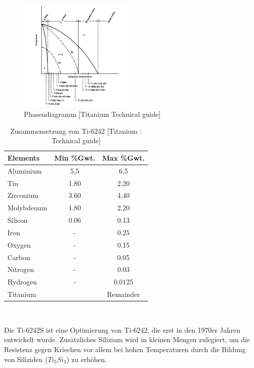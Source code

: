 \begin{figure}[H]
	\centering
	\includegraphics[width=0.5\textwidth]{Bilder/Phasendiagram}
	\caption{Phasendiagramm [Titanium Technical guide]}
	\label{tab:PD-Ti6242}
\end{figure}





\begin{table}[H]
	
	\centering	
	\begin{tabular}{|l |c |c|}
		\hline
		\centering
		\hspace{20ex}Elements \hspace{20ex} & Min \%Gwt. & Max \%Gwt.\\
		\hline
		Aluminium&5,5&6,5\\
		Tin&1.80&2.20\\
		Zirconium&3.60&4.40\\
		Molybdenum&1.80&2.20\\
		Silicon &0.06&0.13\\
		Iron&-&0.25\\
		Oxygen&-&0.15\\
		Carbon&	-&	0.05\\
		Nitrogen&-&0.03\\
		Hydrogen&-&0.0125\\
		
		Titanium &&Remainder\\
		\hline
	\end{tabular}
	\caption{Zusammensetzung von Ti-6242 [Titanium : Technical guide]}
	\label{tab:Zusammensetzung}
\end{table}
\

Die Ti-6242S ist eine Optimierung von Ti-6242, die erst in den 1970er Jahren  entwickelt wurde. Zusätzliches Silizium wird in kleinen Mengen zulegiert, um die Resistenz gegen Kriechen vor allem bei hohen Temperaturen durch die Bildung von Siliziden ($Ti_5Si_3$) zu erhöhen. \cite{C.Leyens.2005} 

